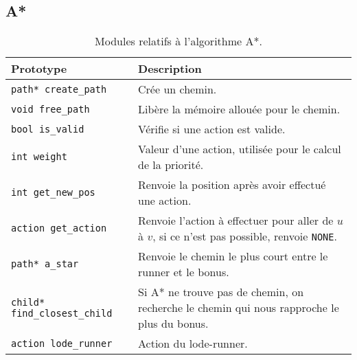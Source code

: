 \newpage

\subsection{A*}

\begin{table}[!htpb]
    \label{tab:modules-a_star}
    \begin{tabularx}{\textwidth}{lX}
        \toprule
        \textbf{Prototype} & \textbf{Description} \\
        \midrule
        \texttt{path* create\_path} & Crée un chemin. \\
        \texttt{void free\_path} & Libère la mémoire allouée pour le chemin. \\
        \texttt{bool is\_valid} & Vérifie si une action est valide. \\
        \texttt{int weight} & Valeur d'une action, utilisée pour le calcul de la priorité. \\
        \texttt{int get\_new\_pos} & Renvoie la position après avoir effectué une action. \\
        \texttt{action get\_action} & Renvoie l'action à effectuer pour aller de $u$ à $v$, si ce n'est pas possible, renvoie \texttt{NONE}. \\
        \texttt{path* a\_star} & Renvoie le chemin le plus court entre le runner et le bonus. \\
        \texttt{child* find\_closest\_child} & Si A* ne trouve pas de chemin, on recherche le chemin qui nous rapproche le plus du bonus. \\
        \texttt{action lode\_runner} & Action du lode-runner. \\
        \bottomrule
    \end{tabularx}
    \caption{Modules relatifs à l'algorithme A*.}
\end{table}


